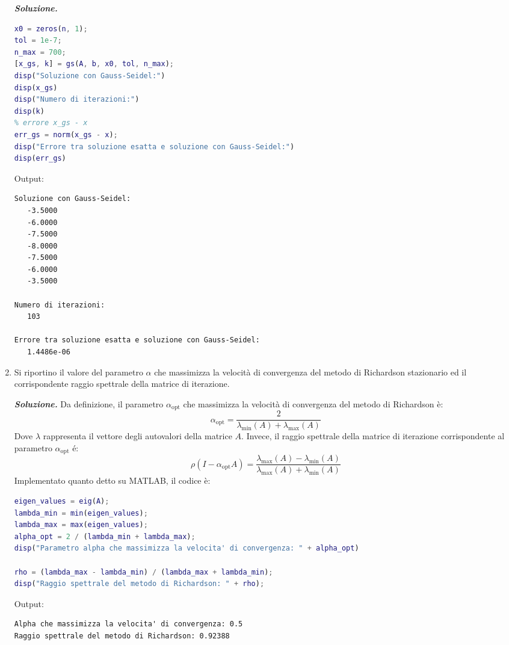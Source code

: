 \begin{enumerate}
    \textcolor{Green3}{\textbf{\emph{Soluzione.}}}
    \begin{lstlisting}[language=MATLAB]
x0 = zeros(n, 1);
tol = 1e-7;
n_max = 700;
[x_gs, k] = gs(A, b, x0, tol, n_max);
disp("Soluzione con Gauss-Seidel:")
disp(x_gs)
disp("Numero di iterazioni:")
disp(k)
% errore x_gs - x
err_gs = norm(x_gs - x);
disp("Errore tra soluzione esatta e soluzione con Gauss-Seidel:")
disp(err_gs)\end{lstlisting}
    Output:
    \begin{lstlisting}
Soluzione con Gauss-Seidel:
   -3.5000
   -6.0000
   -7.5000
   -8.0000
   -7.5000
   -6.0000
   -3.5000

Numero di iterazioni:
   103

Errore tra soluzione esatta e soluzione con Gauss-Seidel:
   1.4486e-06\end{lstlisting}


    \item Si riportino il valore del parametro $\alpha$ che massimizza la velocità di convergenza del metodo di Richardson stazionario ed il corrispondente raggio spettrale della matrice di iterazione.
   
    \textcolor{Green3}{\textbf{\emph{Soluzione.}}} Da definizione, il parametro $\alpha_{\mathrm{opt}}$ che massimizza la velocità di convergenza del metodo di Richardson è:
    \begin{equation*}
        \alpha_{\mathrm{opt}} = \dfrac{2}{\lambda_{\min}(A) + \lambda_{\max}(A)}
    \end{equation*}
    Dove $\lambda$ rappresenta il vettore degli autovalori della matrice $A$. Invece, il raggio spettrale della matrice di iterazione corrispondente al parametro $\alpha_{\mathrm{opt}}$ é:
    \begin{equation*}
        \rho\left(I - \alpha_{\mathrm{opt}}A\right) = \dfrac{
            \lambda_{\max}(A) - \lambda_{\min}(A)
        }{
            \lambda_{\max}(A) + \lambda_{\min}(A)
        }
    \end{equation*}
    Implementato quanto detto su MATLAB, il codice è:
    \begin{lstlisting}[language=MATLAB]
eigen_values = eig(A);
lambda_min = min(eigen_values);
lambda_max = max(eigen_values);
alpha_opt = 2 / (lambda_min + lambda_max);
disp("Parametro alpha che massimizza la velocita' di convergenza: " + alpha_opt)

rho = (lambda_max - lambda_min) / (lambda_max + lambda_min);
disp("Raggio spettrale del metodo di Richardson: " + rho);\end{lstlisting}
    Output:
    \begin{lstlisting}
Alpha che massimizza la velocita' di convergenza: 0.5
Raggio spettrale del metodo di Richardson: 0.92388\end{lstlisting}



\end{enumerate}

